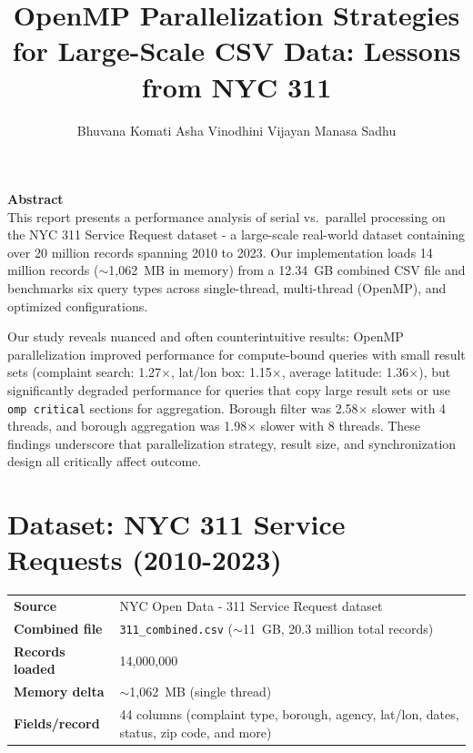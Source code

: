 \documentclass[12pt]{article}
\title{\textbf{OpenMP Parallelization Strategies for Large-Scale CSV Data: Lessons from NYC 311}}
\author{
  Bhuvana Komati \quad Asha Vinodhini Vijayan \quad Manasa Sadhu
}
\begin{document}
\maketitle
\thispagestyle{fancy}
\begin{center}
\begin{minipage}{0.88\textwidth}
\centering
\textbf{Abstract}\\[0.4em]
\small
This report presents a performance analysis of serial vs.\ parallel processing
on the NYC 311 Service Request dataset - a large-scale real-world dataset
containing over 20 million records spanning 2010 to 2023.
Our implementation loads 14 million records ($\sim$1,062~MB in memory) from a
12.34~GB combined CSV file and benchmarks six query types across single-thread,
multi-thread (OpenMP), and optimized configurations.

Our study reveals nuanced and often counterintuitive results: OpenMP
parallelization improved performance for compute-bound queries with small
result sets (complaint search: 1.27$\times$, lat/lon box: 1.15$\times$,
average latitude: 1.36$\times$), but significantly degraded performance for
queries that copy large result sets or use \texttt{omp critical} sections for
aggregation. Borough filter was 2.58$\times$ slower with 4 threads, and borough
aggregation was 1.98$\times$ slower with 8 threads.
These findings underscore that parallelization strategy, result size, and
synchronization design all critically affect outcome.
\end{minipage}
\end{center}

\vspace{0.2em}

\section{Dataset: NYC 311 Service Requests (2010-2023)}

\begin{tabular}{@{}lp{10cm}@{}}
\textbf{Source}         & NYC Open Data - 311 Service Request dataset \\[0.3em]
\textbf{Combined file}  & \texttt{311\_combined.csv} ($\sim$11~GB, 20.3 million total records) \\[0.3em]
\textbf{Records loaded} & 14,000,000 \\[0.3em]
\textbf{Memory delta}   & $\sim$1,062~MB (single thread) \\[0.3em]
\textbf{Fields/record}  & 44 columns (complaint type, borough, agency, lat/lon, dates, status, zip code, and more) \\[0.3em]
\end{tabular}
\end{document}
